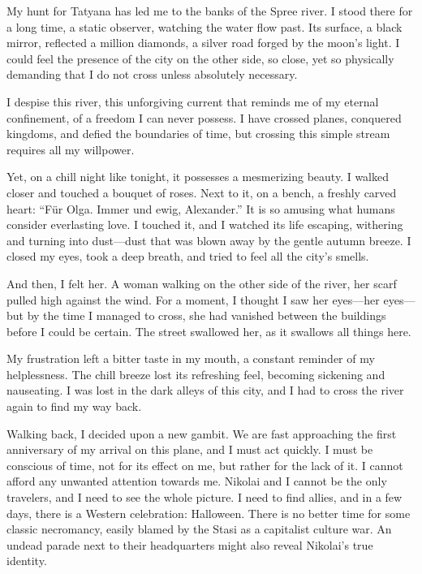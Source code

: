 
My hunt for Tatyana has led me to the banks of the Spree river.
I stood there for a long time, a static observer, watching the water flow past.
Its surface, a black mirror, reflected a million diamonds, a silver road forged by the moon's light.
I could feel the presence of the city on the other side, so close, yet so physically demanding that I do not cross unless absolutely necessary.

I despise this river, this unforgiving current that reminds me of my eternal confinement, of a freedom I can never possess.
I have crossed planes, conquered kingdoms, and defied the boundaries of time, but crossing this simple stream requires all my willpower.

Yet, on a chill night like tonight, it possesses a mesmerizing beauty.
I walked closer and touched a bouquet of roses.
Next to it, on a bench, a freshly carved heart: ``Für Olga. Immer und ewig, Alexander.''
It is so amusing what humans consider everlasting love.
I touched it, and I watched its life escaping, withering and turning into dust—dust that was blown away by the gentle autumn breeze.
I closed my eyes, took a deep breath, and tried to feel all the city's smells.

And then, I felt her.
A woman walking on the other side of the river, her scarf pulled high against the wind.
For a moment, I thought I saw her eyes—her eyes—but by the time I managed to cross, she had vanished between the buildings before I could be certain.
The street swallowed her, as it swallows all things here.

My frustration left a bitter taste in my mouth, a constant reminder of my helplessness.
The chill breeze lost its refreshing feel, becoming sickening and nauseating.
I was lost in the dark alleys of this city, and I had to cross the river again to find my way back.

Walking back, I decided upon a new gambit.
We are fast approaching the first anniversary of my arrival on this plane, and I must act quickly.
I must be conscious of time, not for its effect on me, but rather for the lack of it.
I cannot afford any unwanted attention towards me.
Nikolai and I cannot be the only travelers, and I need to see the whole picture.
I need to find allies, and in a few days, there is a Western celebration: Halloween.
There is no better time for some classic necromancy, easily blamed by the Stasi as a capitalist culture war.
An undead parade next to their headquarters might also reveal Nikolai's true identity.
\vfill\newpage

